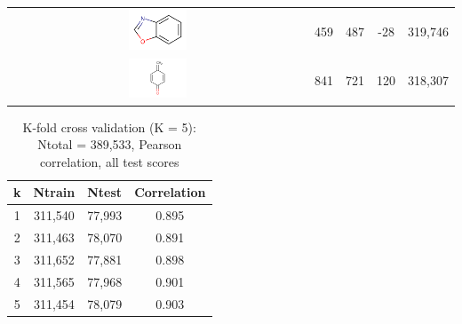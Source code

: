 \begin{table}
\begin{center}
\begin{tabular}{ |c|c|c|c|c| }
\includegraphics[align=c,width=0.2\textwidth]{data/badapple/scaf_14.png} & 459 & 487 & -28 & 319,746 \\
\includegraphics[align=c,width=0.2\textwidth]{data/badapple/scaf_15.png} & 841 & 721 & 120 & 318,307 \\
\hline
\end{tabular}
\end{center}
\label{table:ba_cmp_retro}
\end{table}


\begin{table}
\caption{K-fold cross validation (K = 5): Ntotal = 389,533, Pearson correlation, all test scores}
\begin{center}
\begin{tabular}{ |c|c|c|c| } 
\hline
\textbf{k} & \textbf{Ntrain} & \textbf{Ntest} & \textbf{Correlation} \\
\hline
1 & 311,540 & 77,993 & 0.895 \\
2 & 311,463 & 78,070 & 0.891 \\
3 & 311,652 & 77,881 & 0.898 \\
4 & 311,565 & 77,968 & 0.901 \\
5 & 311,454 & 78,079 & 0.903 \\
\hline
\end{tabular}
\end{center}
\label{table:ba_cmp_xval}
\end{table}


